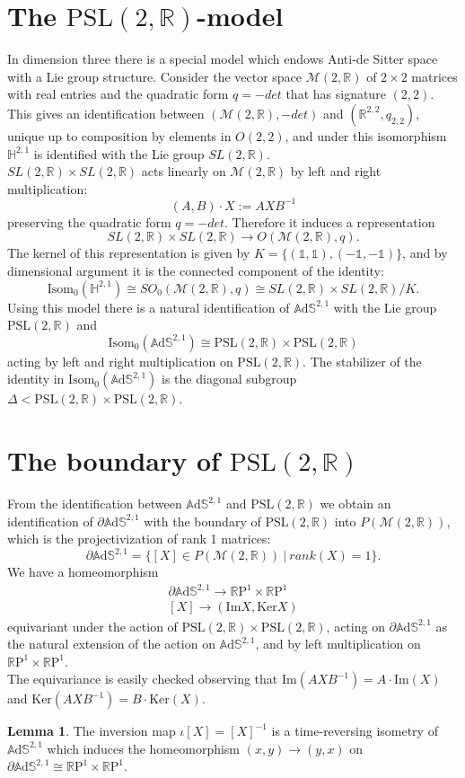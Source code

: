 \documentclass[10pt,a4paper,oneside,reqno]{book}
\def\R{\mathbb{R}}
\def\H{\mathbb{H}}
\def\A{\mathbb{A}\mathrm{d}\mathbb{S}}
\def\1{\mathds{1}}
\def\PSL{\text{PSL}(2,\R)}
\def\T{\R\text{P}^1\times\R\text{P}^1}
\theoremstyle{plain}
\theoremstyle{definition}
\newtheorem{lemma}[theorem]{Lemma} %
\theoremstyle{plain}
\theoremstyle{plain}
\theoremstyle{mystyleNormalFont}
\begin{document}
\section{The $\PSL$-model}
In dimension three there is a special model which endows Anti-de Sitter space with a Lie group structure.
Consider the vector space $\mathcal{M}(2,\R)$ of $2 \times 2$ matrices with real entries and the quadratic form $q= -det$ that has signature $(2,2)$.
This gives an identification between $(\mathcal{M}(2,\R), -det)$ and $(\R^{2,2},q_{2,2})$, unique up to composition by elements in $O(2,2)$, and under this isomorphism $\H^{2,1}$ is identified with the Lie group $SL(2,\R)$.\\
$SL(2,\R)\times SL(2,\R)$ acts linearly on $\mathcal{M}(2,\R)$ by left and right multiplication:
\[
    (A,B) \cdot X := AXB^{-1}    
\]
preserving the quadratic form $q = -det$. Therefore it induces a representation
\[
    SL(2,\R)\times SL(2,\R) \to O(\mathcal{M}(2,\R),q).
\]
The kernel of this representation is given by $K=\{ (\1,\1),(-\1,-\1) \}$, and by dimensional argument it is the connected component of the identity:
\[
    \text{Isom}_0(\H^{2,1}) \cong SO_0(\mathcal{M}(2,\R),q) \cong SL(2,\R)\times SL(2,\R) / K.
\]
Using this model there is a natural identification of $\A^{2,1}$ with the Lie group $\PSL$ and
\[
    \text{Isom}_0(\A^{2,1}) \cong \PSL \times \PSL
\]
acting by left and right multiplication on $\PSL$.
The stabilizer of the identity in $\text{Isom}_0(\A^{2,1})$ is the diagonal subgroup $\Delta < \PSL \times \PSL$.\\

\section{The boundary of $\PSL$}
From the identification between $\A^{2,1}$ and $\PSL$ we obtain an identification of $\partial \A^{2,1}$ with the boundary of $\PSL$ into $P(\mathcal{M}(2,\R))$, which is the projectivization of rank 1 matrices:
\[
    \partial \A^{2,1} = \{ [X] \in P(\mathcal{M}(2,\R)) \ | \ rank(X)=1 \}.
\]
We have a homeomorphism
\begin{align}
    \partial \A^{2,1} \to \T \\
    [X] \to (\text{Im}X, \text{Ker}X)
\end{align}
equivariant under the action of $\PSL \times \PSL$, acting on $\partial\A^{2,1}$ as the natural extension of the action on $\A^{2,1}$, and by left multiplication on $\T$.\\
The equivariance is easily checked observing that $\text{Im}(AXB^{-1}) = A \cdot \text{Im}(X)$ and $\text{Ker}(AXB^{-1}) = B \cdot \text{Ker}(X)$.
\begin{lemma}
    The inversion map $\iota [X] = [X]^{-1}$ is a time-reversing isometry of $\A^{2,1}$ which induces the homeomorphism $(x,y) \to (y,x)$ on $\partial \A^{2,1} \cong \T$.
\end{lemma}
\end{document}

